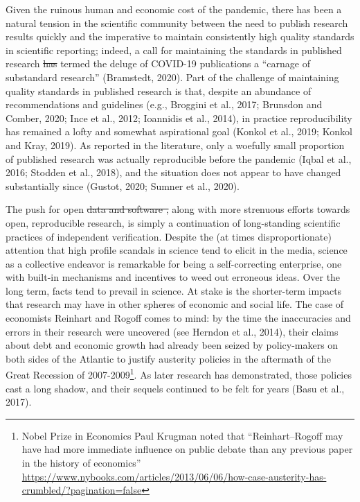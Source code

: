 \documentclass[]{elsarticle} %
\providecommand{\DIFaddtex}[1]{{\protect\color{blue}\uwave{#1}}} %
\providecommand{\DIFdeltex}[1]{{\protect\color{red}\sout{#1}}}                      %
\providecommand{\DIFaddbegin}{} %
\providecommand{\DIFaddend}{} %
\providecommand{\DIFdelbegin}{} %
\providecommand{\DIFdelend}{} %
\providecommand{\DIFadd}[1]{\texorpdfstring{\DIFaddtex{#1}}{#1}} %
\providecommand{\DIFdel}[1]{\texorpdfstring{\DIFdeltex{#1}}{}} %
\newcommand{\DIFscaledelfig}{0.5}
\newlength{\DIFdelgraphicswidth} %
\newlength{\DIFdelgraphicsheight} %
\newcommand{\DIFaddincludegraphics}[2][]{{\color{blue}\fbox{\DIFOincludegraphics[#1]{#2}}}} %
\newcommand{\DIFdelincludegraphics}[2][]{%
\sbox{\DIFdelgraphicsbox}{\DIFOincludegraphics[#1]{#2}}%
\settoboxwidth{\DIFdelgraphicswidth}{\DIFdelgraphicsbox} %
\settoboxtotalheight{\DIFdelgraphicsheight}{\DIFdelgraphicsbox} %
\scalebox{\DIFscaledelfig}{%
\parbox[b]{\DIFdelgraphicswidth}{\usebox{\DIFdelgraphicsbox}\\[-\baselineskip] \rule{\DIFdelgraphicswidth}{0em}}\llap{\resizebox{\DIFdelgraphicswidth}{\DIFdelgraphicsheight}{%
\setlength{\unitlength}{\DIFdelgraphicswidth}%
\begin{picture}(1,1)%
\thicklines\linethickness{2pt} %
{\color[rgb]{1,0,0}\put(0,0){\framebox(1,1){}}}%
{\color[rgb]{1,0,0}\put(0,0){\line( 1,1){1}}}%
{\color[rgb]{1,0,0}\put(0,1){\line(1,-1){1}}}%
\end{picture}%
}\hspace*{3pt}}} %
} %
\DeclareRobustCommand{\DIFaddbegin}{\DIFOaddbegin \let\includegraphics\DIFaddincludegraphics} %
\DeclareRobustCommand{\DIFaddend}{\DIFOaddend \let\includegraphics\DIFOincludegraphics} %
\DeclareRobustCommand{\DIFdelbegin}{\DIFOdelbegin \let\includegraphics\DIFdelincludegraphics} %
\DeclareRobustCommand{\DIFdelend}{\DIFOaddend \let\includegraphics\DIFOincludegraphics} %
\begin{document}
Given the ruinous human and economic cost of the pandemic, there has
been a natural tension in the scientific community between the need to
publish research results quickly and the imperative to maintain
consistently high quality standards in scientific reporting; indeed, a
call for maintaining the standards in published research \DIFdelbegin \DIFdel{has }\DIFdelend termed the
deluge of COVID-19 publications a ``carnage of substandard research''
(Bramstedt, 2020). Part of the challenge of maintaining quality
standards in published research is that, despite an abundance of
recommendations and guidelines (e.g., Broggini et al., 2017; Brunsdon
and Comber, 2020; Ince et al., 2012; Ioannidis et al., 2014), in
practice reproducibility has remained a lofty and somewhat aspirational
goal (Konkol et al., 2019; Konkol and Kray, 2019). As reported in the
literature, only a woefully small proportion of published research was
actually reproducible before the pandemic (Iqbal et al., 2016; Stodden
et al., 2018), and the situation does not appear to have changed
substantially since (Gustot, 2020; Sumner et al., 2020).

The push for open \DIFdelbegin \DIFdel{data and software , }\DIFdelend \DIFaddbegin \DIFadd{software and data (Arribas-Bel et al., 2021; e.g.,
Bivand, 2020), }\DIFaddend along with more strenuous efforts towards open,
reproducible research, is simply a continuation of long-standing
scientific practices of independent verification. Despite the (at times
disproportionate) attention that high profile scandals in science tend
to elicit in the media, science as a collective endeavor is remarkable
for being a self-correcting enterprise, one with built-in mechanisms and
incentives to weed out erroneous ideas. Over the long term, facts tend
to prevail in science. At stake is the shorter-term impacts that
research may have in other spheres of economic and social life. The case
of economists Reinhart and Rogoff comes to mind: by the time the
inaccuracies and errors in their research were uncovered (see Herndon et
al., 2014), their claims about debt and economic growth had already been
seized by policy-makers on both sides of the Atlantic to justify
austerity policies in the aftermath of the Great Recession of
2007-2009\footnote{Nobel Prize in Economics Paul Krugman noted that
  ``Reinhart--Rogoff may have had more immediate influence on public
  debate than any previous paper in the history of economics''
  \url{https://www.nybooks.com/articles/2013/06/06/how-case-austerity-has-crumbled/?pagination=false}}.
As later research has demonstrated, those policies cast a long shadow,
and their sequels continued to be felt for years (Basu et al., 2017).
\end{document}
